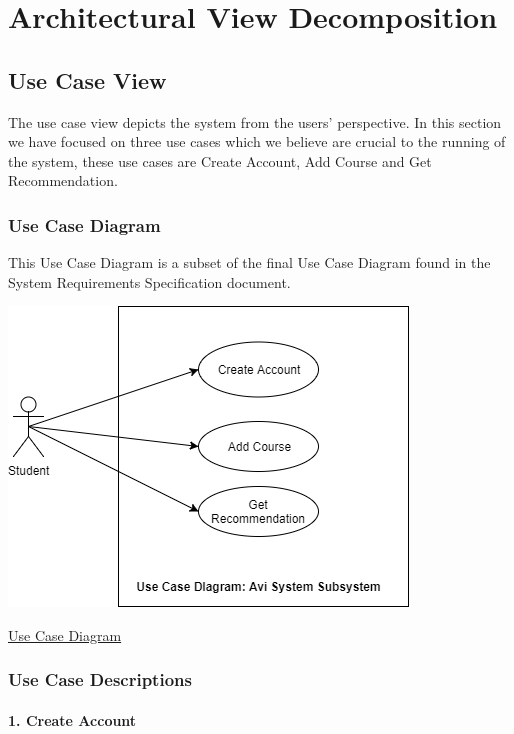 \documentclass[10pt]{article}
\begin{document}
\section{Architectural View Decomposition}

\subsection{Use Case View}

The use case view depicts the system from the users’ perspective. In this section we have focused on three use cases which we believe are crucial to the running of the system, these use cases are Create Account, Add Course and Get Recommendation.

\subsubsection{Use Case Diagram}
This Use Case Diagram is a subset of the final Use Case Diagram found in the System Requirements Specification document.
\begin{center}
\includegraphics[width=.9\textwidth]{use_case_diagram.png}
\end{center}
\caption{\underline{Use Case Diagram}}

\subsubsection{Use Case Descriptions}

\paragraph{1. Create Account \\}
\end{document}
